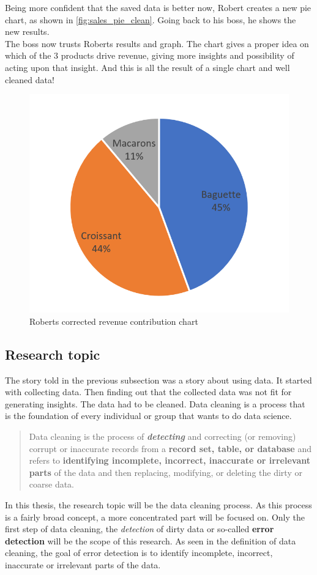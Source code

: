 Being more confident that the saved data is better now, Robert creates a new pie chart, as shown in \autoref{fig:sales_pie_clean}. Going back to his boss, he shows the new results. 
~\\The boss now trusts Roberts results and graph. The chart gives a proper idea on which of the 3 products drive revenue, giving more insights and possibility of acting upon that insight.
And this is all the result of a single chart and well cleaned data!

\begin{figure}[H]
    \centering
    \includegraphics[width=0.5\linewidth]{thesis/Figures/Sales_Pie_Clean.png}
    \caption{Roberts corrected revenue contribution chart}
    \label{fig:sales_pie_clean}
\end{figure}

\subsection{Research topic}
The story told in the previous subsection was a story about using data. It started with collecting data. Then finding out that the collected data was not fit for generating insights. The data had to be cleaned. Data cleaning is a process that is the foundation of every individual or group that wants to do data science.

\blockquote{Data cleaning is the process of \textbf{\textit{detecting}} and correcting (or removing) corrupt or inaccurate records from a \textbf{record set, table, or database} and refers to \textbf{identifying incomplete, incorrect, inaccurate or irrelevant parts} of the data and then replacing, modifying, or deleting the dirty or coarse data.}

In this thesis, the research topic will be the data cleaning process. As this process is a fairly broad concept, a more concentrated part will be focused on. Only the first step of data cleaning, the \textit{detection} of dirty data or so-called \textbf{error detection} will be the scope of this research.
As seen in the definition of data cleaning, the goal of error detection is to identify incomplete, incorrect, inaccurate or irrelevant parts of the data. 

